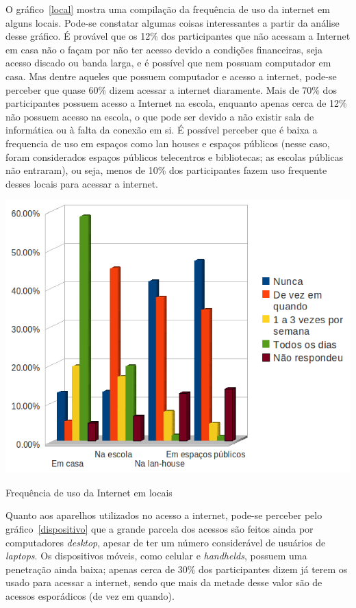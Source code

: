     O gráfico~\ref{local} mostra uma compilação da frequência de uso da internet em alguns locais. Pode-se constatar algumas coisas interessantes a partir da análise desse gráfico. É provável que os 12\% dos participantes que não acessam a Internet em casa não o façam por não ter acesso devido a condições financeiras, seja acesso discado ou banda larga, e é possível que nem possuam computador em casa. Mas dentre aqueles que possuem computador e acesso a internet, pode-se perceber que quase 60\% dizem acessar a internet diaramente. Mais de 70\% dos participantes possuem acesso a Internet na escola, enquanto apenas cerca de 12\% não possuem acesso na escola, o que pode ser devido a não existir sala de informática ou à falta da conexão em si. É possível perceber que é baixa a frequencia de uso em espaços como lan houses e espaços públicos (nesse caso, foram considerados espaços públicos telecentros e bibliotecas; as escolas públicas não entraram), ou seja, menos de 10\% dos participantes fazem uso frequente desses locais para acessar a internet.

    \begin{grafico}
        \begin{center}
    \includegraphics[width=0.7\linewidth]{arquivos/local.png}
        \end{center}
        \caption{Frequência de uso da Internet em locais}
        \label{local}
    \end{grafico}

    Quanto aos aparelhos utilizados no acesso a internet, pode-se perceber pelo gráfico~\ref{dispositivo} que a grande parcela dos acessos são feitos ainda por computadores \textit{desktop}, apesar de ter um número considerável de usuários de \textit{laptops}. Os dispositivos móveis, como celular e \textit{handhelds}, possuem uma penetração ainda baixa; apenas cerca de 30\% dos participantes dizem já terem os usado para acessar a internet, sendo que mais da metade desse valor são de acessos esporádicos (de vez em quando).

